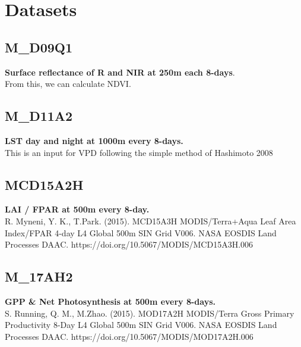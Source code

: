 \documentclass[a4paper,12pt,single,pdftex]{scrartcl}
\title{}
\begin{document}
 
\maketitle
\newpage
\newpage

\section{Datasets}
\subsection{M\_D09Q1}

    
      {\bf Surface reflectance of R and NIR at 250m each 8-days}.
    \\

    
      From this, we can calculate NDVI.
    \\

  \subsection{M\_D11A2}

    
      {\bf LST day and night at 1000m every 8-days.}
    \\

    
      This is an input for VPD following the simple method of Hashimoto 2008
    \\

  \subsection{MCD15A2H}

    
      {\bf LAI / FPAR at 500m every 8-day. }
    \\

    
      R. Myneni, Y. K., T.Park. (2015). MCD15A3H MODIS/Terra+Aqua Leaf Area Index/FPAR 4-day L4 Global 500m SIN Grid V006. NASA EOSDIS Land Processes DAAC. https://doi.org/10.5067/MODIS/MCD15A3H.006
    \\

  \subsection{M\_17AH2}

    
      {\bf GPP \& Net Photosynthesis at 500m every 8-days.}
    \\

    
      S. Running, Q. M., M.Zhao. (2015). MOD17A2H MODIS/Terra Gross Primary Productivity 8-Day L4 Global 500m SIN Grid V006. NASA EOSDIS Land Processes DAAC. https://doi.org/10.5067/MODIS/MOD17A2H.006
    \\
\end{document}
